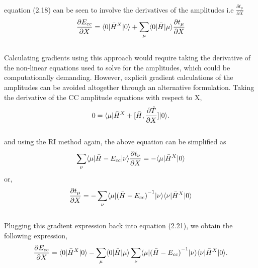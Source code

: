 \\
equation (2.18) can be seen to involve the derivatives of the amplitudes i.e $\frac{\partial{t_\mu}}{\partial X}$
\\
\begin{equation}
\frac{\partial{E_{cc}}}{\partial X} = \langle 0 |{\bar{H}}^X| 0 \rangle + \sum_{\mu}\langle 0 |\bar{H}| \mu \rangle \frac{\partial{t_{\mu}}}{\partial X}
\end{equation}
\\
Calculating gradients using this approach would require taking the derivative of the non-linear equations
used to solve for the amplitudes, which could be computationally demanding. However, explicit gradient 
calculations of the amplitudes can be avoided altogether through an alternative formulation.
Taking the derivative of the CC amplitude equations with respect to X, 
\\
\begin{equation} 
0 = \langle \mu |{\bar{H}}^X + \lbrack\bar H , \frac{\partial{\hat T}}{\partial
X}\rbrack| 0 \rangle.
\end{equation} 
\\
and using the RI method again, the above equation can be simplified as
\\
\begin{equation}
\sum_{\nu}\langle \mu |\bar{H}-E_{cc}| \nu \rangle \frac{\partial{t_\nu}}{\partial X}
= - \langle \mu |{\bar{H}}^X| 0 \rangle
\end{equation}
or,
\begin{equation} 
\frac{\partial{t_\mu}}{\partial X} = -\sum_{\nu}
\langle \mu |{(\bar{H}-E_{cc})}^{-1}| \nu \rangle\langle \nu |{\bar{H}}^X| 0 \rangle
\end{equation}
\\
Plugging this gradient expression back into equation (2.21), we obtain the following expression,
\\
\begin{equation}
\frac{\partial{E_{cc}}}{\partial X} = \langle 0 |{\bar{H}}^X| 0 \rangle -
\sum_{\mu}\langle 0 |\bar{H}| \mu \rangle\sum_{\nu}
\langle \mu |{(\bar{H}-E_{cc})}^{-1}| \nu \rangle
\langle \nu |{\bar{H}}^X| 0 \rangle.
\end{equation}
